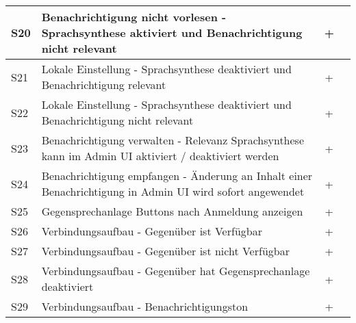\begin{table}[h]
\begin{tabular}{|l|p{11cm}|c|c|}
        \hline
        S20         & Benachrichtigung nicht vorlesen - Sprachsynthese aktiviert und Benachrichtigung nicht relevant & +\\
        \hline
        S21         & Lokale Einstellung - Sprachsynthese deaktiviert und Benachrichtigung relevant  & +\\
        \hline
        S22         & Lokale Einstellung - Sprachsynthese deaktiviert und Benachrichtigung nicht relevant  & +\\
        \hline
        S23         & Benachrichtigung verwalten - Relevanz Sprachsynthese kann im Admin UI aktiviert / deaktiviert werden  & +\\
        \hline
        S24         & Benachrichtigung empfangen - Änderung an Inhalt einer Benachrichtigung in Admin UI wird sofort angewendet   & +\\
        \hline
        S25         & Gegensprechanlage Buttons nach Anmeldung anzeigen & +\\
        \hline
        S26         & Verbindungsaufbau - Gegenüber ist Verfügbar & +\\
        \hline
        S27         & Verbindungsaufbau - Gegenüber ist nicht Verfügbar & +\\
        \hline
        S28         & Verbindungsaufbau - Gegenüber hat Gegensprechanlage deaktiviert & +\\
        \hline
        S29         & Verbindungsaufbau - Benachrichtigungston & +\\
        \hline
    \end{tabular}\label{tab:funktion_testplan_1}
\end{table}

\clearpage

